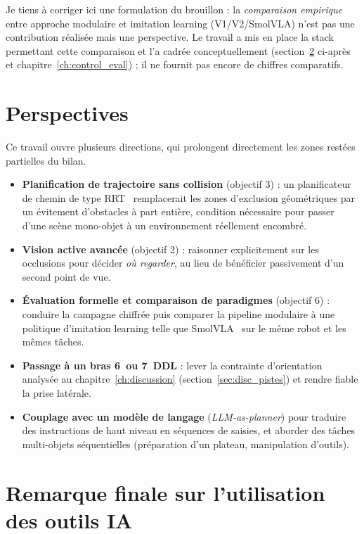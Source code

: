 Je tiens à corriger ici une formulation du brouillon : la \emph{comparaison
empirique} entre approche modulaire et imitation learning (V1/V2/SmolVLA)
n'est pas une contribution réalisée mais une perspective. Le travail a mis en
place la stack permettant cette comparaison et l'a cadrée conceptuellement
(section~\ref{sec:concl_ia} ci-après et chapitre~\ref{ch:control_eval}) ; il ne
fournit pas encore de chiffres comparatifs.

\section{Perspectives}
\label{sec:concl_perspectives}

Ce travail ouvre plusieurs directions, qui prolongent directement les zones
restées partielles du bilan.

\begin{itemize}
  \item \textbf{Planification de trajectoire sans collision} (objectif 3) : un
        planificateur de chemin de type RRT~\cite{lavalle_planning_2006}
        remplacerait les zones d'exclusion géométriques par un évitement
        d'obstacles à part entière, condition nécessaire pour passer d'une scène
        mono-objet à un environnement réellement encombré.
  \item \textbf{Vision active avancée} (objectif 2) : raisonner explicitement sur
        les occlusions pour décider \emph{où regarder}, au lieu de bénéficier
        passivement d'un second point de vue.
  \item \textbf{Évaluation formelle et comparaison de paradigmes} (objectif 6) :
        conduire la campagne chiffrée puis comparer la pipeline modulaire à une
        politique d'imitation learning telle que
        SmolVLA~\cite{shukor_smolvla_2025} sur le même robot et les mêmes tâches.
  \item \textbf{Passage à un bras 6~ou 7~DDL} : lever la contrainte
        d'orientation analysée au chapitre~\ref{ch:discussion}
        (section~\ref{sec:disc_pistes}) et rendre fiable la prise latérale.
  \item \textbf{Couplage avec un modèle de langage}
        (\textit{LLM-as-planner}) pour traduire des instructions de haut niveau
        en séquences de saisies, et aborder des tâches multi-objets
        séquentielles (préparation d'un plateau, manipulation d'outils).
\end{itemize}

\section{Remarque finale sur l'utilisation des outils IA}
\label{sec:concl_ia}

